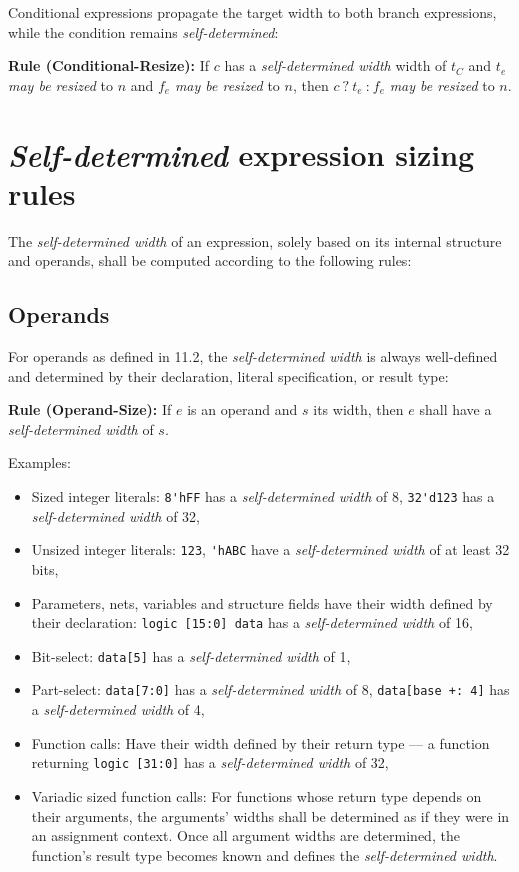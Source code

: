 \documentclass{article}
\newcommand{\sds}{\emph{self-determined width}}
\newcommand{\mbr}{\emph{may be resized}}
\newenvironment{typingrule}[1]%
{\par\noindent\textbf{Rule (#1):} }%
{\par}
\begin{document}
Conditional expressions propagate the target width to both branch expressions,
while the condition remains \emph{self-determined}:

\begin{typingrule}{Conditional-Resize}
  If $c$ has a \sds{} width of $t_{C}$ and $t_{e}$ \mbr{} to $n$ and $f_{e}$
  \mbr{} to $n$, then $c~\texttt{?}~t_{e}~\texttt{:}~f_{e}$ \mbr{} to $n$.
\end{typingrule}

\section{\emph{Self-determined} expression sizing rules}%
\label{self-determined}

The \sds{} of an expression, solely based on its internal
structure and operands, shall be computed according to the following rules:

\subsection{Operands}%

For operands as defined in 11.2, the \sds{} is always
well-defined and determined by their declaration, literal specification, or
result type:

\begin{typingrule}{Operand-Size}
  If $e$ is an operand and $s$ its width, then $e$ shall have a \sds{} of $s$.
\end{typingrule}

Examples:

\begin{itemize}
  \item Sized integer literals: \verb|8'hFF| has a \sds{} of 8,
    \verb|32'd123| has a \sds{} of 32,
  \item Unsized integer literals: \verb|123|, \verb|'hABC| have a
    \sds{} of at least 32 bits,
  \item Parameters, nets, variables and structure fields have their width
    defined by their declaration: \verb|logic [15:0] data| has a
    \sds{} of 16,
  \item Bit-select: \verb|data[5]| has a \sds{} of 1,
  \item Part-select: \verb|data[7:0]| has a \sds{} of 8,
    \verb|data[base +: 4]| has a \sds{} of 4,
  \item Function calls: Have their width defined by their return type --- a
    function returning \verb|logic [31:0]| has a
    \sds{} of 32,
  \item Variadic sized function calls: For functions whose return type depends
    on their arguments, the arguments' widths shall be determined as if
    they were in an assignment context. Once all argument widths are
    determined, the function's result type becomes known and defines the
    \sds{}.
\end{itemize}
\end{document}
